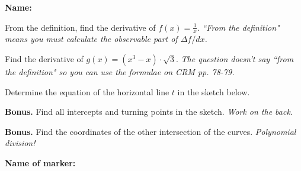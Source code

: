 \documentclass[9pt]{exam}
\begin{document}
\textbf{Name:} \dotfill

\vspace{-2mm}

\begin{questions}

\question[3] From the definition, find the derivative of $f(x) = \frac{1}{x}$.\newline
\emph{``From the definition" means you must calculate the observable part of $\Delta f / dx$.}

\fillwithdottedlines{48mm}

\question[2] Find the derivative of $g(x) = (x^3 - x) \cdot \sqrt{3}$. \newline
\emph{The question doesn't say ``from the definition" so you can use the formulae on CRM pp. 78-79.}
\fillwithdottedlines{28mm}

\question[2] Determine the equation of the horizontal line $t$ in the sketch below. 
\vspace{-2mm}

\begin{minipage}{0.4\textwidth}

\end{minipage}
\begin{minipage}{0.6\textwidth}

\fillwithdottedlines{85mm}

\end{minipage}


\vfill

\question[0] \textbf{Bonus.} Find all intercepts and turning points in the sketch. \hfill \emph{Work on the back.}

\question[0] \textbf{Bonus.} Find the coordinates of the other intersection of the curves. \hfill \emph{Polynomial division!}

\end{questions}


\begin{tcolorbox}

\textbf{Name of marker:}

\begin{center}
\gradetable[h][questions]
\end{center}

\end{tcolorbox}
\end{document}
